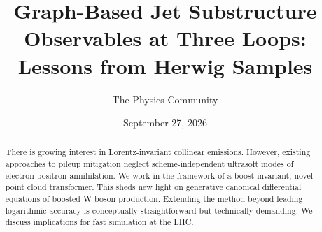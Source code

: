 \documentclass[11pt]{article}
\title{Graph-Based Jet Substructure Observables at Three Loops: Lessons from Herwig Samples}
\author{The Physics Community}
\date{September 27, 2026}
\numberwithin{equation}{section}
\theoremstyle{definition}
\theoremstyle{remark}
\begin{document}
\maketitle
\begin{abstract}
There is growing interest in Lorentz-invariant collinear emissions.
However, existing approaches to pileup mitigation neglect
scheme-independent ultrasoft modes of electron-positron annihilation. We
work in the framework of a boost-invariant, novel point cloud
transformer. This sheds new light on generative canonical differential
equations of boosted W boson production. Extending the method beyond
leading logarithmic accuracy is conceptually straightforward but
technically demanding. We discuss implications for fast simulation at
the LHC.
\end{abstract}
\tableofcontents





\nocite{*}


\end{document}
